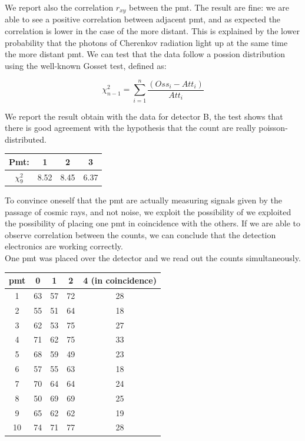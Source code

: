 We report also the correlation $r_{xy}$ between the pmt. The result are fine: we are able to see a positive correlation between adjacent pmt, and as expected the correlation is lower in the case of the more distant. This is explained by the lower probability that the photons of Cherenkov radiation light up at the same time the more distant pmt.
We can test that the data follow a possion distribution using the well-known Gosset test, defined as:

\begin{equation}
\chi^{2}_{n-1} = \sum_{i = 1}^{n} \dfrac{(Oss_{i} - Att_{i})}{Att_{i}}
\end{equation}

We report the result obtain with the data for detector B, the test shows that there is good agreement with the hypothesis that the count are really poisson-distributed.

\begingroup
\setlength{\tabcolsep}{8pt} %
\renewcommand{\arraystretch}{1.2} %
\begin{center}
\begin{tabular}{|c|c|c|c|}
\hline 
Pmt: & 1 & 2 & 3 \\ 
\hline
$\chi^{2}_{9}$ & 8.52 & 8.45 & 6.37 \\ 
\hline
\end{tabular} 
\end{center}
\endgroup

To convince oneself that the pmt are actually measuring signals given by the passage of cosmic rays, and not noise, we exploit the possibility of we exploited the possibility of placing one pmt in coincidence with the others. If we are able to observe correlation between the counts, we can conclude that the detection electronics are working correctly. \\
One pmt was placed over the detector and we read out the counts simultaneously.

\begin{center}
\begin{tabular}{|c|c|c|c|c|}
\hline 
pmt & 0 & 1 & 2 & 4 (in coincidence) \\ 
\hline 
1 & 63 & 57 & 72 & 28 \\ 
\hline 
2 & 55 & 51 & 64 & 18 \\ 
\hline 
3 & 62 & 53 & 75 & 27 \\ 
\hline 
4 & 71 & 62 & 75 & 33 \\ 
\hline 
5 & 68 & 59 & 49 & 23 \\ 
\hline 
6 & 57 & 55 & 63 & 18 \\ 
\hline 
7 & 70 & 64 & 64 & 24 \\ 
\hline 
8 & 50 & 69 & 69 & 25 \\ 
\hline 
9 & 65 & 62 & 62 & 19 \\ 
\hline 
10 & 74 & 71 & 77 & 28 \\ 
\hline 
\end{tabular} 
\end{center} 

